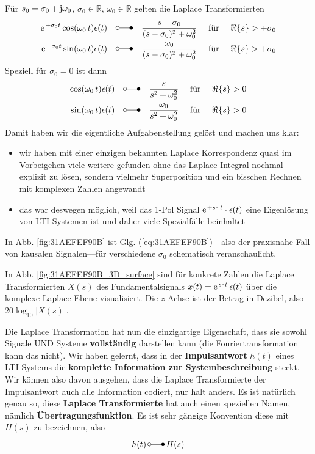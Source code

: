 \documentclass[11pt,a4paper,DIV=12]{scrartcl}
\numberwithin{equation}{section}
\numberwithin{figure}{section}
\newcommand{\eq}[1]{Glg. (\ref{#1})} %
\newcommand{\fig}[1]{Abb. \ref{#1}} %
\begin{document}
\begin{Loesung}
Für $s_0=\sigma_0 + \im \omega_0$,
$\sigma_0\in\mathbb{R}$,
$\omega_0\in\mathbb{R}$
gelten die Laplace Transformierten
\begin{align}
\label{eq:31AEFEF90B}
\e^{+\sigma_0 t} \cos(\omega_0 \, t) \epsilon(t)
\quad \laplace \quad
\frac{s-\sigma_0}{(s-\sigma_0)^2+\omega_0^2}
\quad\text{ für } \quad\Re\{s\} >  +\sigma_0
\\
\e^{+\sigma_0 t} \sin(\omega_0 \, t) \epsilon(t)
\quad \laplace \quad
\frac{\omega_0}{(s-\sigma_0)^2+\omega_0^2}
\quad\text{ für } \quad\Re\{s\} >  +\sigma_0
\end{align}
Speziell für $\sigma_0=0$ ist dann
\begin{align}
\cos(\omega_0 \, t) \epsilon(t)
\quad \laplace \quad
\frac{s}{s^2+\omega_0^2}
\quad\text{ für } \quad\Re\{s\} > 0
\\
\sin(\omega_0 \, t) \epsilon(t)
\quad \laplace \quad
\frac{\omega_0}{s^2+\omega_0^2}
\quad\text{ für } \quad\Re\{s\} > 0
\end{align}
%
Damit haben wir die eigentliche Aufgabenstellung gelöst und machen uns klar:
\begin{itemize}
\item wir haben mit einer einzigen bekannten Laplace Korrespondenz
quasi im Vorbeigehen viele weitere gefunden
ohne das Laplace Integral nochmal explizit zu lösen, sondern vielmehr Superposition
und ein bisschen Rechnen mit komplexen Zahlen angewandt
\item das war deswegen möglich, weil das 1-Pol Signal
$\e^{+s_0 \, t} \cdot \epsilon(t)$ eine Eigenlösung von LTI-Systemen ist und
daher viele Spezialfälle beinhaltet
\end{itemize}

In \fig{fig:31AEFEF90B} ist \eq{eq:31AEFEF90B}---also der praxisnahe Fall von
kausalen Signalen---für verschiedene $\sigma_0$ schematisch veranschaulicht.

In \fig{fig:31AEFEF90B_3D_surface} sind für konkrete Zahlen die Laplace
Transformierten $X(s)$ des Fundamentalsignals $x(t)=\e^{s_0 t}\,\epsilon(t)$
über die komplexe Laplace Ebene visualisiert.
Die $z$-Achse ist der Betrag in Dezibel, also
$20 \log_{10}|X(s)|$.

\textbf{}
Die Laplace Transformation hat nun die einzigartige Eigenschaft, dass sie
sowohl Signale UND Systeme \textbf{vollständig} darstellen kann
(die Fouriertransformation kann das nicht).
%
Wir haben gelernt, dass in der \textbf{Impulsantwort} $h(t)$ eines LTI-Systems die
\textbf{komplette Information zur Systembeschreibung} steckt.
%
Wir können also davon ausgehen, dass die Laplace Transformierte der Impulsantwort
auch alle Information codiert, nur halt anders. Es ist natürlich genau so, diese
\textbf{Laplace Transformierte} hat auch einen speziellen Namen, nämlich
\textbf{Übertragungsfunktion}.
Es ist sehr gängige Konvention diese mit $H(s)$ zu bezeichnen, also
\begin{equation}
h(t) \, \laplace \, H(s)
\end{equation}
%


\end{Loesung}
\end{document}
